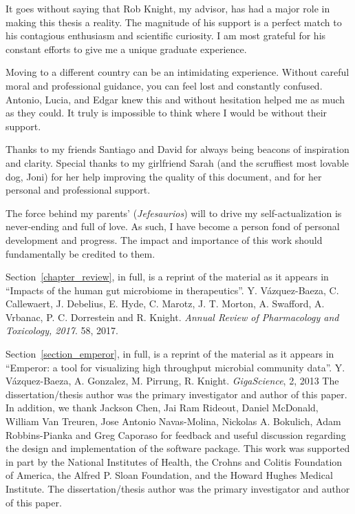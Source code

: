\begin{frontmatter}
\begin{acknowledgements}
    It goes without saying that Rob Knight, my advisor, has had a major role in 
    making this thesis a reality. The magnitude of his support is a perfect 
    match to his contagious enthusiasm and scientific curiosity. I am most 
    grateful for his constant efforts to give me a unique graduate experience.

    Moving to a different country can be an intimidating experience. Without 
    careful moral and professional guidance, you can feel lost and constantly 
    confused. Antonio, Lucia, and Edgar knew this and without hesitation helped 
    me as much as they could. It truly is impossible to think where I would be 
    without their support.

    Thanks to my friends Santiago and David for always being beacons of 
    inspiration and clarity. Special thanks to my girlfriend Sarah (and the 
    scruffiest most lovable dog, Joni) for her help improving the quality of 
    this document, and for her personal and professional support.

    The force behind my parents' (\textit{Jefesaurios}) will to drive my 
    self-actualization is never-ending and full of love. As such, I have become 
    a person fond of personal development and progress. The impact and 
    importance of this work should fundamentally be credited to them.

    Section~\ref{chapter_review}, in full, is a reprint of the material as it 
    appears in ``Impacts of the human gut microbiome in therapeutics''. Y.  
    V\'azquez-Baeza, C. Callewaert, J. Debelius, E. Hyde, C.  Marotz, J. T.  
    Morton, A. Swafford, A. Vrbanac, P. C.  Dorrestein and R.  Knight.  
    \emph{Annual Review of Pharmacology and Toxicology, 2017}. 58, 2017.

    Section~\ref{section_emperor}, in full, is a reprint of the material as it 
    appears in ``Emperor: a tool for visualizing high throughput microbial 
    community data''. Y. V\'azquez-Baeza, A. Gonzalez, M. Pirrung, R.  Knight.  
    \emph{GigaScience}, 2, 2013 The dissertation/thesis author was the primary 
    investigator and author of this paper. In addition, we thank Jackson Chen, 
    Jai Ram Rideout, Daniel McDonald, William Van Treuren, Jose Antonio 
    Navas\hyp{}Molina, Nickolas A. Bokulich, Adam Robbins\hyp{}Pianka and Greg 
    Caporaso for feedback and useful discussion regarding the design and 
    implementation of the software package. This work was supported in part by 
    the National Institutes of Health, the Crohns and Colitis Foundation of 
    America, the Alfred P. Sloan Foundation, and the Howard Hughes Medical 
    Institute. The dissertation/thesis author was the primary investigator and 
    author of this paper.


\end{acknowledgements}
\end{frontmatter}
